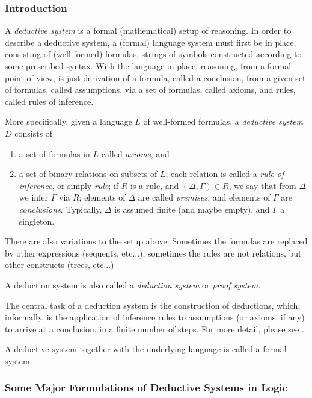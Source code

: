 \documentclass[12pt]{article}
\begin{document}
\subsubsection*{Introduction}

A \emph{deductive system} is a formal (mathematical) setup of reasoning.  In order to describe a deductive system, a (formal) language system must first be in place, consisting of (well-formed) formulas, strings of symbols constructed according to some prescribed syntax.  With the language in place, reasoning, from a formal point of view, is just derivation of a formula, called a conclusion, from a given set of formulas, called assumptions, via a set of formulas, called axioms, and rules, called rules of inference.

More specifically, given a language $L$ of well-formed formulas, a \emph{deductive system} $D$ consists of
\begin{enumerate}
\item a set of formulas in $L$ called \emph{axioms}, and 
\item a set of binary relations on subsets of $L$; each relation is called a \emph{rule of inference}, or simply \emph{rule}; if $R$ is a rule, and $(\Delta, \Gamma)\in R$, we say that from $\Delta$ we infer $\Gamma$ via $R$; elements of $\Delta$ are called \emph{premises}, and elements of $\Gamma$ are \emph{conclusions}.  Typically, $\Delta$ is assumed finite (and maybe empty), and $\Gamma$ a singleton.
\end{enumerate}
There are also variations to the setup above.  Sometimes the formulas are replaced by other expressions (sequents, etc...), sometimes the rules are not relations, but other constructs (trees, etc...)

A deduction system is also called a \emph{deduction system} or \emph{proof system}.

The central task of a deduction system is the construction of deductions, which, informally, is the application of inference rules to assumptions (or axioms, if any) to arrive at a conclusion, in a finite number of steps.  For more detail, please see .

A deductive system together with the underlying language is called a formal system.

\subsubsection*{Some Major Formulations of Deductive Systems in Logic}
\end{document}

